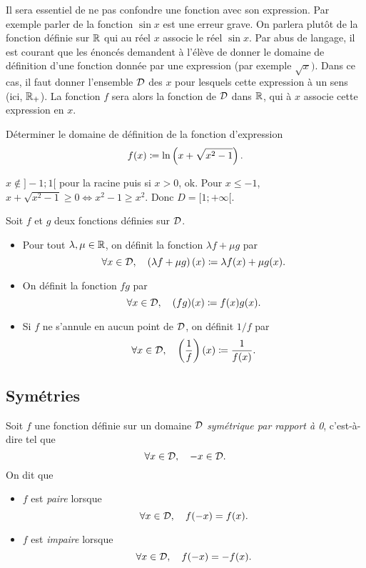 \documentclass{magnolia}
\begin{document}
\begin{remarques}
\remarque Il sera essentiel de ne pas confondre une fonction avec son
  expression.
  Par exemple parler de la fonction $\sin x$ est une erreur grave. On
  parlera plutôt de la fonction définie sur $\mathbb{R}$ qui au réel $x$ associe le
  réel $\sin x$.
\remarque Par abus de langage, il est courant que les énoncés demandent à
  l'élève de donner le domaine de définition d'une fonction donnée par une
  expression (par exemple $\sqrt{x})$. Dans ce cas, il faut donner l'ensemble
  $\mathcal{D}$ des $x$ pour lesquels cette expression à un sens (ici, $\mathbb{R}_+$). La
  fonction $f$ sera alors la fonction de
  $\mathcal{D}$ dans $\mathbb{R}$, qui à $x$ associe cette expression en $x$.
\end{remarques}

\begin{exoUnique}
\exo Déterminer le domaine de définition de la fonction d'expression
  \[f(x)\coloneqq\ln\left(x+\sqrt{x^2-1}\right).\]
\end{exoUnique}
\begin{sol}
$x\notin]-1;1[$ pour la racine puis si $x>0$, ok. Pour $x\leq -1$, $x+\sqrt{x^2-1}\geq 0 \Longleftrightarrow x^2-1\geq x^2$. Donc $D=[1;+\infty[$.
\end{sol}

\begin{definition}[utile=-3]
Soit $f$ et $g$ deux fonctions définies sur $\mathcal{D}$.
\begin{itemize}
\item Pour tout $\lambda,\mu\in\mathbb{R}$, on définit la fonction $\lambda f+\mu g$
  par
  \[\forall x\in\mathcal{D} ,\quad \left(\lambda f+\mu g\right)(x)\coloneqq
    \lambda f(x)+\mu g(x).\]
\item On définit la fonction $fg$ par
  \[\forall x\in\mathcal{D} ,\quad (fg)(x)\coloneqq f(x)g(x).\]
\item Si $f$ ne s'annule en aucun point de $\mathcal{D}$, on définit $1/f$ par
  \[\forall x\in\mathcal{D} ,\quad \left(\frac{1}{f}\right)(x)\coloneqq\frac{1}{f(x)}.\]
\end{itemize}
\end{definition}



\subsection{Symétries}
\begin{definition}[utile=-3]
  Soit $f$ une fonction définie sur un domaine $\mathcal{D}$ \emph{symétrique par rapport
  à 0}, c'est-à-dire tel que
\[\forall x\in\mathcal{D} ,\quad -x\in\mathcal{D}.\]
  On dit que
  \begin{itemize}
  \item $f$ est \emph{paire} lorsque
    $$\forall x\in\mathcal{D} ,\quad f(-x)=f(x).$$
  \item $f$ est \emph{impaire} lorsque
    $$\forall x\in\mathcal{D} ,\quad f(-x)=-f(x).$$
  \end{itemize}
\end{definition}
\end{document}
